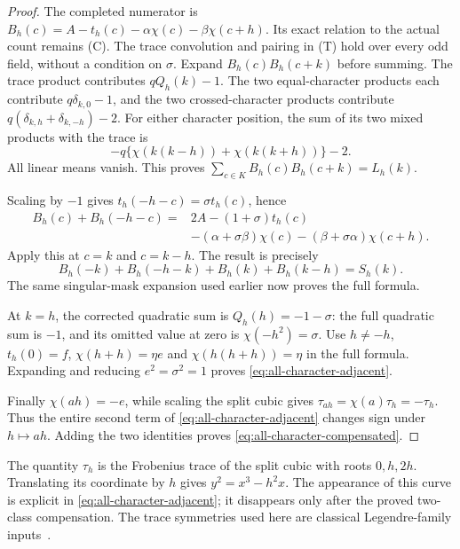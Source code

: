 \documentclass[11pt]{article}
\begin{document}
\begin{proof}
The completed numerator is
\(B_h(c)=A-t_h(c)-\alpha\chi(c)-\beta\chi(c+h)\).
Its exact relation to the actual count remains (C). The trace convolution
and pairing in (T) hold over every odd field, without a condition on
\(\sigma\). Expand \(B_h(c)B_h(c+k)\) before summing. The trace product
contributes \(qQ_h(k)-1\). The two equal-character products each contribute
\(q\delta_{k,0}-1\), and the two crossed-character products contribute
\(q(\delta_{k,h}+\delta_{k,-h})-2\). For either character position, the
sum of its two mixed products with the trace is
\[
 -q\{\chi(k(k-h))+\chi(k(k+h))\}-2.
\]
All linear means vanish. This proves
\(\sum_{c\in K}B_h(c)B_h(c+k)=L_h(k)\).

Scaling by \(-1\) gives \(t_h(-h-c)=\sigma t_h(c)\), hence
\begin{align*}
 B_h(c)+B_h(-h-c)
 ={}&2A-(1+\sigma)t_h(c)\\
 &-(\alpha+\sigma\beta)\chi(c)
   -(\beta+\sigma\alpha)\chi(c+h).
\end{align*}
Apply this at \(c=k\) and \(c=k-h\). The result is precisely
\[
 B_h(-k)+B_h(-h-k)+B_h(k)+B_h(k-h)=S_h(k).
\]
The same singular-mask expansion used earlier now proves the full formula.

At \(k=h\), the corrected quadratic sum is
\(Q_h(h)=-1-\sigma\): the full quadratic sum is \(-1\), and its
omitted value at zero is \(\chi(-h^2)=\sigma\).
Use \(h\ne-h\), \(t_h(0)=f\),
\(\chi(h+h)=\eta e\) and \(\chi(h(h+h))=\eta\) in the full formula.
Expanding and reducing \(e^2=\sigma^2=1\) proves
\eqref{eq:all-character-adjacent}.

Finally \(\chi(ah)=-e\), while scaling the split cubic gives
\(\tau_{ah}=\chi(a)\tau_h=-\tau_h\).
Thus the entire second term of
\eqref{eq:all-character-adjacent} changes sign under \(h\mapsto ah\).
Adding the two identities proves
\eqref{eq:all-character-compensated}.
\end{proof}

The quantity \(\tau_h\) is the Frobenius trace of the split cubic with
roots \(0,h,2h\). Translating its coordinate by \(h\) gives
\(y^2=x^3-h^2x\). The appearance of this curve is explicit in
\eqref{eq:all-character-adjacent}; it disappears only after the proved
two-class compensation. The trace symmetries used here are classical
Legendre-family inputs~\cite{KatzTraceRatios}.
\end{document}
